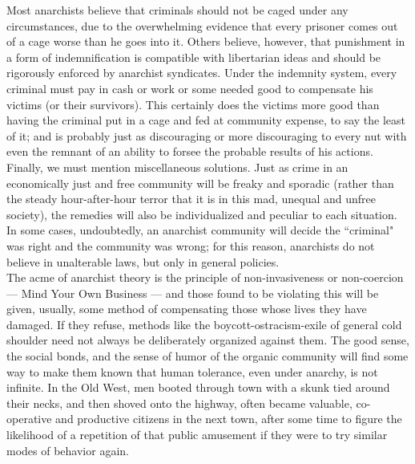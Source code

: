 Most anarchists believe that criminals should not be caged under any circumstances, due to the overwhelming evidence that every prisoner comes out of a cage worse than he goes into it. Others believe, however, that punishment in a form of indemnification is compatible with libertarian ideas and should be rigorously enforced by anarchist syndicates. Under the indemnity system, every criminal must pay in cash or work or some needed good to compensate his victims (or their survivors). This certainly does the victims more good than having the criminal put in a cage and fed at community expense, to say the least of it; and is probably just as discouraging or more discouraging to every nut with even the remnant of an ability to forsee the probable results of his actions.\\
Finally, we must mention miscellaneous solutions. Just as crime in an economically just and free community will be freaky and sporadic (rather than the steady hour-after-hour terror that it is in this mad, unequal and unfree society), the remedies will also be individualized and peculiar to each situation. In some cases, undoubtedly, an anarchist community will decide the ``criminal" was right and the community was wrong; for this reason, anarchists do not believe in unalterable laws, but only in general policies.\\
The acme of anarchist theory is the principle of non-invasiveness or non-coercion --- Mind Your Own Business --- and those found to be violating this will be given, usually, some method of compensating those whose lives they have damaged. If they refuse, methods like the boycott-ostracism-exile of general cold shoulder need not always be deliberately organized against them. The good sense, the social bonds, and the sense of humor of the organic community will find some way to make them known that human tolerance, even under anarchy, is not infinite. In the Old West, men booted through town with a skunk tied around their necks, and then shoved onto the highway, often became valuable, co-operative and productive citizens in the next town, after some time to figure the likelihood of a repetition of that public amusement if they were to try similar modes of behavior again.